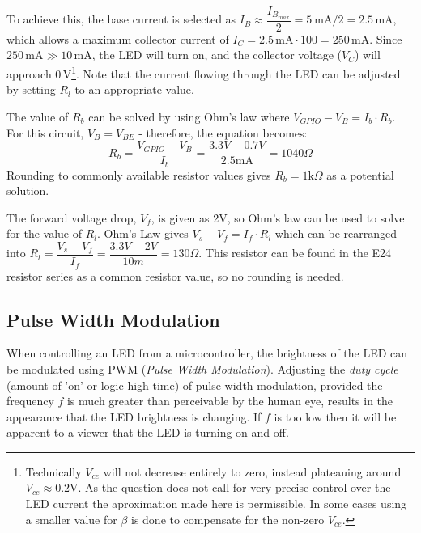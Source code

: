 \documentclass[main.tex]{subfiles}
\begin{document}
\newnoindentpara To achieve this, the base current is selected as \( I_B \approx \dfrac{I_{B_{max}}}{2} = 5 \ \text{mA}/2 = 2.5\,\text{mA} \), which allows a maximum collector current of \( I_C = 2.5\,\text{mA} \cdot 100 = 250\,\text{mA} \). Since \( 250\,\text{mA} \gg 10\,\text{mA} \), the LED will turn on, and the collector voltage (\( V_C \)) will approach \( 0\,\text{V} \)\footnote{Technically $V_{ce}$ will not decrease entirely to zero, instead plateauing around $V_{ce} \approx 0.2 \text{V}$. As the question does not call for very precise control over the LED current the aproximation made here is permissible. In some cases using a smaller value for $\beta$ is done to compensate for the non-zero $V_{ce}$.}. Note that the current flowing through the LED can be adjusted by setting \( R_l \) to an appropriate value. \newline

\newnoindentpara The value of $R_b$ can be solved by using Ohm's law where $V_{GPIO} - V_B = I_b \cdot R_b$. For this circuit, $V_B = V_{BE}$ - therefore, the equation becomes:
\begin{equation}
    R_b = \dfrac{V_{GPIO} - V_B}{I_b} = \dfrac{3.3V-0.7V}{2.5 \text{mA}} = 1040 \Omega
    \label{eq:led_current_limitting_resistor_math}
\end{equation}
Rounding to commonly available resistor values gives  $R_b = 1 \text{k} \Omega$ as a potential solution. \newline

\newnoindentpara The forward voltage drop, $V_f$, is given as 2V, so Ohm's law can be used to solve for the value of $R_l$. Ohm's Law gives $V_s - V_f = I_f \cdot R_l$ which can be rearranged into $R_l = \dfrac{V_s - V_f}{I_f} = \dfrac{3.3V-2V}{10m} = 130 \Omega$. This resistor can be found in the E24 resistor series as a common resistor value, so no rounding is needed. 

\subsection{Pulse Width Modulation}
When controlling an LED from a microcontroller, the brightness of the LED can be modulated using PWM (\textit{Pulse Width Modulation}). Adjusting the \textit{duty cycle} (amount of 'on' or logic high time) of pulse width modulation, provided the frequency $f$ is much greater than perceivable by the human eye, results in the appearance that the LED brightness is changing. If $f$ is too low then it will be apparent to a viewer that the LED is turning on and off. \newline
\end{document}
